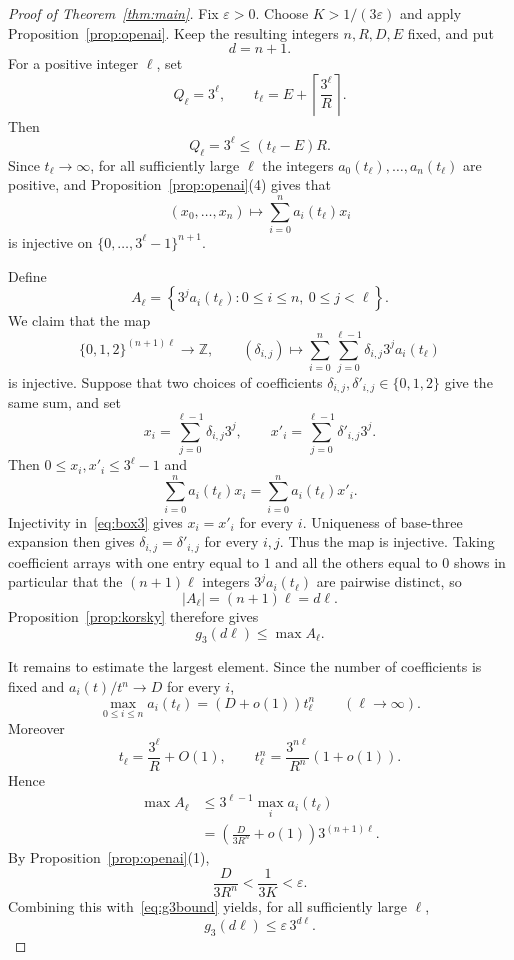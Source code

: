 \documentclass[10pt,a4paper]{amsart}
\newcommand{\Z}{\mathbb Z}
\newcommand{\ee}{\varepsilon}
\begin{document}
\begin{proof}[Proof of Theorem~\ref{thm:main}]
Fix $\ee>0$. Choose $K>1/(3\ee)$ and apply Proposition~\ref{prop:openai}. Keep the resulting integers $n,R,D,E$ fixed, and put
\[
 d=n+1.
\]
For a positive integer $\ell$, set
\[
 Q_\ell=3^\ell,
 \qquad
 t_\ell=E+\left\lceil\frac{3^\ell}{R}\right\rceil.
\]
Then
\[
 Q_\ell=3^\ell\le(t_\ell-E)R.
\]
Since $t_\ell\to\infty$, for all sufficiently large $\ell$ the integers
$a_0(t_\ell),\ldots,a_n(t_\ell)$ are positive, and Proposition~\ref{prop:openai}(4) gives that
\begin{equation}\label{eq:box3}
 (x_0,\ldots,x_n)\longmapsto
 \sum_{i=0}^n a_i(t_\ell)x_i
\end{equation}
is injective on $\{0,\ldots,3^\ell-1\}^{n+1}$.

Define
\[
 A_\ell=
 \left\{3^j a_i(t_\ell):0\le i\le n,\ 0\le j<\ell\right\}.
\]
We claim that the map
\[
 \{0,1,2\}^{(n+1)\ell}\longrightarrow\Z,
 \qquad
 (\delta_{i,j})\longmapsto
 \sum_{i=0}^n\sum_{j=0}^{\ell-1}\delta_{i,j}3^j a_i(t_\ell)
\]
is injective. Suppose that two choices of coefficients $\delta_{i,j},\delta'_{i,j}\in\{0,1,2\}$ give the same sum, and set
\[
 x_i=\sum_{j=0}^{\ell-1}\delta_{i,j}3^j,
 \qquad
 x'_i=\sum_{j=0}^{\ell-1}\delta'_{i,j}3^j.
\]
Then $0\le x_i,x'_i\le3^\ell-1$ and
\[
 \sum_{i=0}^n a_i(t_\ell)x_i
 =\sum_{i=0}^n a_i(t_\ell)x'_i.
\]
Injectivity in~\eqref{eq:box3} gives $x_i=x'_i$ for every $i$. Uniqueness of base-three expansion then gives $\delta_{i,j}=\delta'_{i,j}$ for every $i,j$. Thus the map is injective. Taking coefficient arrays with one entry equal to $1$ and all the others equal to $0$ shows in particular that the $(n+1)\ell$ integers $3^j a_i(t_\ell)$ are pairwise distinct, so
\[
 |A_\ell|=(n+1)\ell=d\ell.
\]
Proposition~\ref{prop:korsky} therefore gives
\begin{equation}\label{eq:g3bound}
 g_3(d\ell)\le \max A_\ell.
\end{equation}

It remains to estimate the largest element. Since the number of coefficients is fixed and
$a_i(t)/t^n\to D$ for every $i$,
\[
 \max_{0\le i\le n}a_i(t_\ell)=(D+o(1))t_\ell^n
 \qquad(\ell\to\infty).
\]
Moreover
\[
 t_\ell=\frac{3^\ell}{R}+O(1),
 \qquad
 t_\ell^n=\frac{3^{n\ell}}{R^n}(1+o(1)).
\]
Hence
\begin{align*}
 \max A_\ell
 &\le 3^{\ell-1}\max_i a_i(t_\ell)\\
 &=\left(\frac{D}{3R^n}+o(1)\right)3^{(n+1)\ell}.
\end{align*}
By Proposition~\ref{prop:openai}(1),
\[
 \frac{D}{3R^n}<\frac1{3K}<\ee.
\]
Combining this with~\eqref{eq:g3bound} yields, for all sufficiently large $\ell$,
\[
 g_3(d\ell)\le\ee\,3^{d\ell}.
\]
\end{proof}
\end{document}
